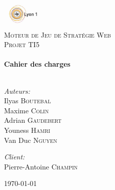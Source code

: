 \begin{titlepage}

\begin{center}

\includegraphics[width=0.15\textwidth]{img/logo_ucbl.jpg}\\[1cm]

\textsc{\LARGE Moteur de Jeu de Stratégie Web}\\[1.5cm]

\textsc{\Large Projet TI5}\\[0.5cm]

\HRule \\[0.6cm]
{ \huge \bfseries Cahier des charges}\\[0.4cm]

\HRule \\[1.5cm]

\begin{minipage}{0.4\textwidth}
\begin{flushleft} \large
\emph{Auteurs:}\\
Ilyas \textsc{Boutebal}\\ Maxime \textsc{Colin}\\ Adrian \textsc{Gaudebert}\\ Youness \textsc{Hamri}\\ Van Duc \textsc{Nguyen}
\end{flushleft}
\end{minipage}
\begin{minipage}{0.4\textwidth}
\begin{flushright} \large
\emph{Client:} \\
Pierre-Antoine \textsc{Champin}
\end{flushright}
\end{minipage}

\vfill

{\large \today}

\end{center}

\end{titlepage}